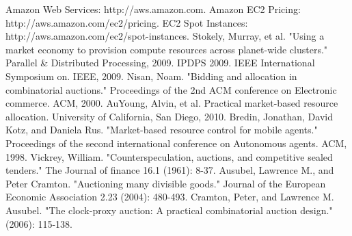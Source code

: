 \documentclass[11pt]{article}
\begin{document}

\begin{thebibliography}{99}
  Amazon Web Services: http://aws.amazon.com.
  Amazon EC2 Pricing: http://aws.amazon.com/ec2/pricing.
  EC2 Spot Instances: http://aws.amazon.com/ec2/spot-instances.
  Stokely, Murray, et al. "Using a market economy to provision compute resources across planet-wide clusters." Parallel \& Distributed Processing, 2009. IPDPS 2009. IEEE International Symposium on. IEEE, 2009.
  Nisan, Noam. "Bidding and allocation in combinatorial auctions." Proceedings of the 2nd ACM conference on Electronic commerce. ACM, 2000.
  AuYoung, Alvin, et al. Practical market-based resource allocation. University of California, San Diego, 2010.
  Bredin, Jonathan, David Kotz, and Daniela Rus. "Market-based resource control for mobile agents." Proceedings of the second international conference on Autonomous agents. ACM, 1998.
  Vickrey, William. "Counterspeculation, auctions, and competitive sealed tenders." The Journal of finance 16.1 (1961): 8-37.
  Ausubel, Lawrence M., and Peter Cramton. "Auctioning many divisible goods." Journal of the European Economic Association 2.23 (2004): 480-493.
  Cramton, Peter, and Lawrence M. Ausubel. "The clock-proxy auction: A practical combinatorial auction design." (2006): 115-138.
\end{thebibliography}
\end{document}

